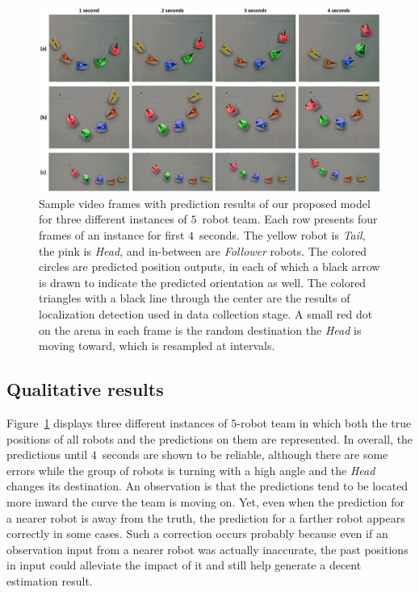 \documentclass[letterpaper, 10 pt, conference]{ieeeconf}  %
\begin{document}
	\begin{figure}[t]
		\centering
		\includegraphics[width=2.\columnwidth]{fig_preds}
		\caption{Sample video frames with prediction results of our proposed model 
			for three different instances of $5$~robot team.
			Each row presents four frames of an instance for first $4$~seconds.   
			The yellow robot is \emph{Tail}, the pink is \emph{Head}, and
			in-between are \emph{Follower} robots. 
			The colored circles are predicted position outputs, in each 
			of which a black arrow is drawn to indicate the predicted orientation as well. 
			The colored triangles with a black line through the center are the 
			results of localization detection used in data collection stage. 
			A small red dot on the arena in each frame is the random destination the 
			\emph{Head} is moving toward, which is resampled at intervals. 
		}
		\label{fig:preds}
	\end{figure}

	
	\subsection{Qualitative results} 
	\label{sec:qualitative_results} 

	Figure~\ref{fig:preds} displays three different instances of $5$-robot team
	in which both the true positions of all robots and the predictions on them are represented. 
	In overall, the predictions
	until $4$~seconds are shown to be reliable, although there are some errors while the
	group of robots is turning with a high angle and the \emph{Head} changes its destination. 
	An observation is that the predictions tend to be located more inward the curve the team is moving on. 
	Yet, even when the prediction for a nearer robot is away from the truth, the prediction 
	for a farther robot appears correctly in some cases. 
	Such a correction occurs probably because even if an observation input from a nearer robot was 
	actually inaccurate, the past positions in input could alleviate the impact of it and still 
	help generate a decent estimation result.
\end{document}
